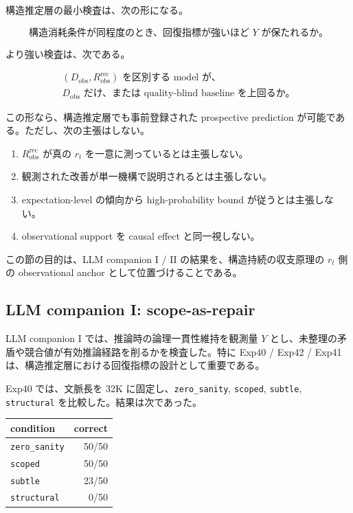 \documentclass[12pt,a4paper]{article}
\begin{document}
構造推定層の最小検査は、次の形になる。

\[
\text{構造消耗条件が同程度のとき、回復指標が強いほど }Y\text{ が保たれるか。}
\]

より強い検査は、次である。

\[
\begin{aligned}
(D_{\mathrm{obs}},R_{\mathrm{obs}}^{\mathrm{rec}})\text{ を区別する model が、} \\
D_{\mathrm{obs}}\text{ だけ、または quality-blind baseline を上回るか。}
\end{aligned}
\]

この形なら、構造推定層でも事前登録された prospective prediction が可能である。ただし、次の主張はしない。

\begin{enumerate}
\def\labelenumi{\arabic{enumi}.}
\tightlist
\item
  \(R_{\mathrm{obs}}^{\mathrm{rec}}\) が真の \(r_{t}\) を一意に測っているとは主張しない。
\item
  観測された改善が単一機構で説明されるとは主張しない。
\item
  expectation-level の傾向から high-probability bound が従うとは主張しない。
\item
  observational support を causal effect と同一視しない。
\end{enumerate}

この節の目的は、LLM companion I / II の結果を、構造持続の収支原理の \(r_{t}\) 側の observational anchor として位置づけることである。

\subsection{LLM companion I: scope-as-repair}\label{llm-companion-i-scope-as-repair}

LLM companion I では、推論時の論理一貫性維持を観測量 \(Y\) とし、未整理の矛盾や競合値が有効推論経路を削るかを検査した。特に Exp40 / Exp42 / Exp41 は、構造推定層における回復指標の設計として重要である。

Exp40 では、文脈長を 32K に固定し、\texttt{zero\_sanity}, \texttt{scoped}, \texttt{subtle}, \texttt{structural} を比較した。結果は次であった。

{\def\LTcaptype{table} %
\begin{longtable}[]{@{}lr@{}}
\toprule\noalign{}
condition & correct \\
\midrule\noalign{}
\endhead
\bottomrule\noalign{}
\endlastfoot
\texttt{zero\_sanity} & 50/50 \\
\texttt{scoped} & 50/50 \\
\texttt{subtle} & 23/50 \\
\texttt{structural} & 0/50 \\
\end{longtable}
}
\end{document}
